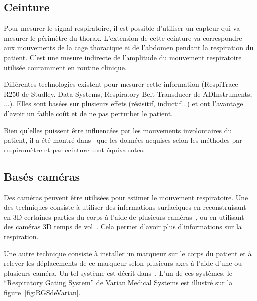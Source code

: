 \subsection{Ceinture}

Pour mesurer le signal respiratoire, il est possible d'utiliser un capteur qui va mesurer le périmètre du thorax. L'extension de cette ceinture va correspondre aux mouvements de la cage thoracique et de l'abdomen pendant la respiration du patient. C'est une mesure indirecte de l'amplitude du mouvement respiratoire utilisée couramment en routine clinique. 

Différentes technologies existent pour mesurer cette information (RespiTrace R250 de Studley. Data Systems, Respiratory Belt Transducer de ADInstruments, ...). Elles sont basées sur plusieurs effets (résisitif, inductif...) et ont l'avantage d'avoir un faible coût et de ne pas perturber le patient.

Bien qu'elles puissent être influencées par les mouvements involontaires du patient, il a été montré dans~\cite{Guivarch2004Sync} que les données acquises selon les méthodes par respiromètre et par ceinture sont équivalentes.

\subsection{Basés caméras}

Des caméras peuvent être utilisées pour estimer le mouvement respiratoire. Une des techniques consiste à utiliser des informations surfaciques en reconstruisant en 3D certaines parties du corps à l'aide de plusieurs caméras~\cite{beach2004feasibility}, ou en utilisant des caméras 3D temps de vol~\cite{fayad2009patient}. Cela permet d'avoir plus d'informations sur la respiration.

Une autre technique consiste à installer un marqueur sur le corps du patient et à relever les déplacements de ce marqueur selon plusieurs axes à l'aide d'une ou plusieurs caméra. Un tel système est décrit dans~\cite{nehmeh2002effect}. L'un de ces systèmes, le ``Respiratory Gating System'' de Varian Medical Systems est illustré sur  la figure~\ref{fig:RGSdeVarian}.

